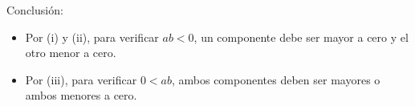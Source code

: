 \begin{enumerate}[label=\alph*)]
 Conclusión:
 \begin{itemize}
  \item Por (i) y (ii), para verificar $ab<0$, un componente debe ser mayor a cero y el otro menor a cero.%
  \item Por (iii), para verificar $0<ab$, ambos componentes deben ser mayores o ambos menores a cero.%
 \end{itemize}
%

\end{enumerate}
